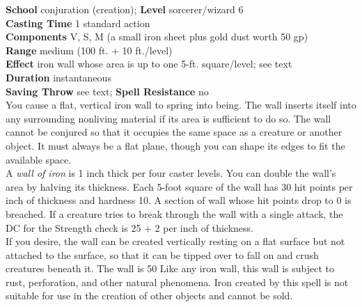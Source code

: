 \textbf{School} conjuration (creation); \textbf{Level} sorcerer/wizard 6\\
\textbf{Casting Time} 1 standard action\\
\textbf{Components} V, S, M (a small iron sheet plus gold dust worth 50 gp)\\
\textbf{Range }medium (100 ft. + 10 ft./level)\\
\textbf{Effect} iron wall whose area is up to one 5-ft. square/level; see text\\
\textbf{Duration} instantaneous\\
\textbf{Saving Throw} see text; \textbf{Spell Resistance} no\\
You cause a flat, vertical iron wall to spring into being. The wall inserts itself into any surrounding nonliving material if its area is sufficient to do so. The wall cannot be conjured so that it occupies the same space as a creature or another object. It must always be a flat plane, though you can shape its edges to fit the available space.\\
A \textit{wall of iron }is 1 inch thick per four caster levels. You can double the wall's area by halving its thickness. Each 5-foot square of the wall has 30 hit points per inch of thickness and hardness 10. A section of wall whose hit points drop to 0 is breached. If a creature tries to break through the wall with a single attack, the DC for the Strength check is 25 + 2 per inch of thickness.\\
If you desire, the wall can be created vertically resting on a flat surface but not attached to the surface, so that it can be tipped over to fall on and crush creatures beneath it. The wall is 50%
Like any iron wall, this wall is subject to rust, perforation, and other natural phenomena. Iron created by this spell is not suitable for use in the creation of other objects and cannot be sold.\\
